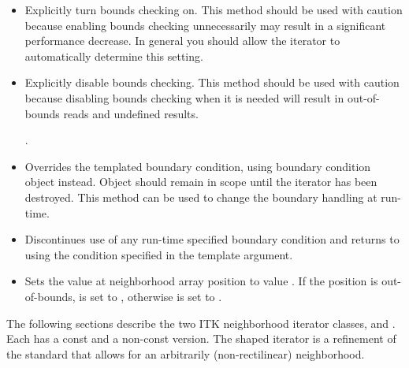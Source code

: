 {\begin{itemize}

\item \textbf{} Explicitly turn
bounds checking on.  This method should be used with caution because
enabling bounds checking unnecessarily may result in a significant performance
decrease. In general you should allow the iterator to automatically determine
this setting.

\item \textbf{} Explicitly disable
bounds checking. This method should be used with caution because disabling
bounds checking when it is needed will result in out-of-bounds reads and
undefined results.

.
\item \textbf{} 
Overrides the templated boundary condition, using boundary condition object
 instead. Object  should remain in scope until the iterator has
been destroyed.  This method can be used to change the boundary handling at
run-time.

\item \textbf{} Discontinues use of any
run-time specified boundary condition and returns to using the condition
specified in the template argument.

\item \textbf{} Sets the value at neighborhood array position  to value
.  If the position  is out-of-bounds,  is set to
, otherwise  is set to .
\end{itemize}


The following sections describe the two ITK neighborhood iterator classes,
 and .
Each has a const and a non-const version.  The shaped iterator is a refinement
of the standard  that allows for an arbitrarily
(non-rectilinear) neighborhood.

}
